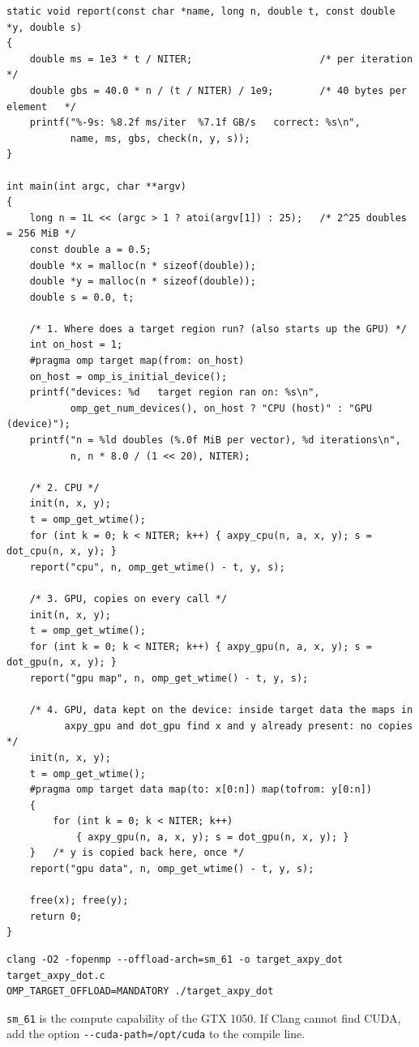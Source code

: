 \documentclass[11pt,a4paper]{article}
\let\origtexttt\texttt
\renewcommand{\texttt}[1]{\textcolor{black!60}{\origtexttt{#1}}}
\begin{document}
\begin{lstlisting}[caption={\textbf{\origtexttt{target\_axpy\_dot.c}} -- \origtexttt{axpy} and dot product on the CPU and on the GPU, with and without \origtexttt{target data}.}, label={lst:gpu}]
static void report(const char *name, long n, double t, const double *y, double s)
{
    double ms = 1e3 * t / NITER;                      /* per iteration          */
    double gbs = 40.0 * n / (t / NITER) / 1e9;        /* 40 bytes per element   */
    printf("%-9s: %8.2f ms/iter  %7.1f GB/s   correct: %s\n",
           name, ms, gbs, check(n, y, s));
}

int main(int argc, char **argv)
{
    long n = 1L << (argc > 1 ? atoi(argv[1]) : 25);   /* 2^25 doubles = 256 MiB */
    const double a = 0.5;
    double *x = malloc(n * sizeof(double));
    double *y = malloc(n * sizeof(double));
    double s = 0.0, t;

    /* 1. Where does a target region run? (also starts up the GPU) */
    int on_host = 1;
    #pragma omp target map(from: on_host)
    on_host = omp_is_initial_device();
    printf("devices: %d   target region ran on: %s\n",
           omp_get_num_devices(), on_host ? "CPU (host)" : "GPU (device)");
    printf("n = %ld doubles (%.0f MiB per vector), %d iterations\n",
           n, n * 8.0 / (1 << 20), NITER);

    /* 2. CPU */
    init(n, x, y);
    t = omp_get_wtime();
    for (int k = 0; k < NITER; k++) { axpy_cpu(n, a, x, y); s = dot_cpu(n, x, y); }
    report("cpu", n, omp_get_wtime() - t, y, s);

    /* 3. GPU, copies on every call */
    init(n, x, y);
    t = omp_get_wtime();
    for (int k = 0; k < NITER; k++) { axpy_gpu(n, a, x, y); s = dot_gpu(n, x, y); }
    report("gpu map", n, omp_get_wtime() - t, y, s);

    /* 4. GPU, data kept on the device: inside target data the maps in
          axpy_gpu and dot_gpu find x and y already present: no copies */
    init(n, x, y);
    t = omp_get_wtime();
    #pragma omp target data map(to: x[0:n]) map(tofrom: y[0:n])
    {
        for (int k = 0; k < NITER; k++)
            { axpy_gpu(n, a, x, y); s = dot_gpu(n, x, y); }
    }   /* y is copied back here, once */
    report("gpu data", n, omp_get_wtime() - t, y, s);

    free(x); free(y);
    return 0;
}
\end{lstlisting}

\begin{lstlisting}[style=sh]
clang -O2 -fopenmp --offload-arch=sm_61 -o target_axpy_dot target_axpy_dot.c
OMP_TARGET_OFFLOAD=MANDATORY ./target_axpy_dot
\end{lstlisting}
\texttt{sm\_61} is the compute capability of the GTX 1050. If Clang cannot find CUDA, add
the option \texttt{-{}-cuda-path=/opt/cuda} to the compile line.
\end{document}
